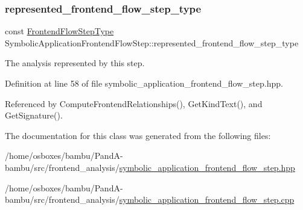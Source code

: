 \subsubsection{\texorpdfstring{represented\+\_\+frontend\+\_\+flow\+\_\+step\+\_\+type}{represented\_frontend\_flow\_step\_type}}
{\footnotesize\ttfamily const \hyperlink{frontend__flow__step_8hpp_afeb3716c693d2b2e4ed3e6d04c3b63bb}{Frontend\+Flow\+Step\+Type} Symbolic\+Application\+Frontend\+Flow\+Step\+::represented\+\_\+frontend\+\_\+flow\+\_\+step\+\_\+type\hspace{0.3cm}{\ttfamily [private]}}



The analysis represented by this step. 



Definition at line 58 of file symbolic\+\_\+application\+\_\+frontend\+\_\+flow\+\_\+step.\+hpp.



Referenced by Compute\+Frontend\+Relationships(), Get\+Kind\+Text(), and Get\+Signature().



The documentation for this class was generated from the following files\+:\begin{DoxyCompactItemize}
\item 
/home/osboxes/bambu/\+Pand\+A-\/bambu/src/frontend\+\_\+analysis/\hyperlink{symbolic__application__frontend__flow__step_8hpp}{symbolic\+\_\+application\+\_\+frontend\+\_\+flow\+\_\+step.\+hpp}\item 
/home/osboxes/bambu/\+Pand\+A-\/bambu/src/frontend\+\_\+analysis/\hyperlink{symbolic__application__frontend__flow__step_8cpp}{symbolic\+\_\+application\+\_\+frontend\+\_\+flow\+\_\+step.\+cpp}\end{DoxyCompactItemize}
